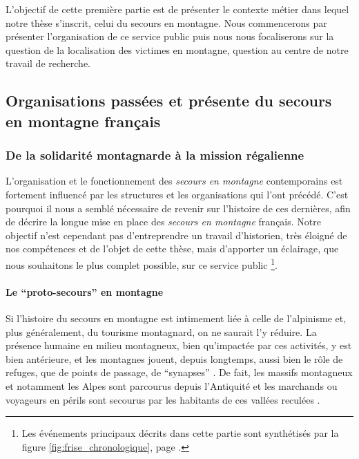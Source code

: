 
L'objectif de cette première partie est de présenter le contexte
métier dans lequel notre thèse s'inscrit, celui du secours en
montagne. Nous commencerons par présenter l'organisation de ce service
public puis nous nous focaliserons sur la question de la localisation
des victimes en montagne, question au centre de notre travail de
recherche.

\subsection{Organisations passées et présente du secours en montagne
  français}
\label{subsec:1-1-1}

\subsubsection{De la solidarité montagnarde à la mission régalienne}
\label{subsubsec:1-1-1-1}

L'organisation et le fonctionnement des \emph{secours en montagne}
contemporains est fortement influencé par les structures et les
organisations qui l'ont précédé. C'est pourquoi il nous a semblé
nécessaire de revenir sur l'histoire de ces dernières, afin de décrire
la longue mise en place des \emph{secours en montagne} français. Notre
objectif n'est cependant pas d'entreprendre un travail d'historien,
très éloigné de nos compétences et de l'objet de cette thèse, mais
d'apporter un éclairage, que nous souhaitons le plus complet possible,
sur ce service public \footnote{Les événements principaux décrits dans
  cette partie sont synthétisés par la figure
  \ref{fig:frise_chronologique}, page
  \pageref{fig:frise_chronologique}.}.

\paragraph{Le \enquote{proto-secours} en montagne}
\label{par:1-1-1-1-1}

Si l'histoire du secours en montagne est intimement liée à celle de
l'alpinisme et, plus généralement, du tourisme montagnard, on ne
saurait l'y réduire. La présence humaine en milieu montagneux, bien
qu'impactée par ces activités, y est bien antérieure, et les montagnes
jouent, depuis longtemps, aussi bien le rôle de refuges, que de points
de passage, de \enquote{synapses} \autocite[p. 337]{Brunet1992}. De
fait, les massifs montagneux et notamment les Alpes sont parcourus
depuis l'Antiquité et les marchands ou voyageurs en périls sont
secourus par les habitants de ces vallées reculées
\autocite{Mezin2016}.

